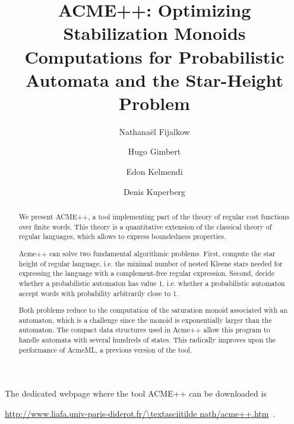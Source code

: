 \documentclass[11pt]{llncs}
\title{ACME++: Optimizing Stabilization Monoids Computations for Probabilistic Automata and the Star-Height Problem}
\author{Nathana\"el Fijalkow\inst{1,2} \and Hugo Gimbert\inst{3} \and Edon Kelmendi\inst{3} \and Denis Kuperberg\inst{4}}
\institute{LIAFA, Paris 7, France \and University of Warsaw, Poland \and LaBRI, Bordeaux, France \and Onera, Toulouse, France}
\begin{document}
\maketitle
\begin{abstract}
We present ACME++, 
a tool implementing part of the theory of regular cost functions
over finite words. 
This theory is a quantitative extension of the classical theory of regular languages,
which allows to express boundedness properties. 
%

Acme++ can solve two fundamental algorithmic problems.
First, compute the star height of regular language, 
i.e. the minimal number of nested Kleene stars needed for 
expressing the language with a complement-free regular expression.
Second, decide whether a probabilistic automaton has value 1,
i.e. whether a probabilistic automaton accept words with probability arbitrarily close to 1.

Both problems reduce to the computation of the saturation monoid associated with an automaton,
which is a challenge since the monoid is exponentially larger than the automaton.
The compact data structures used in Acme++ allow this program to handle automata with
several hundreds of states. This radically improves upon the performance of AcmeML,
a previous version of the tool.


\end{abstract}

The dedicated webpage where the tool ACME++ can be downloaded is
\begin{center}
\url{http://www.liafa.univ-paris-diderot.fr/\textasciitilde nath/acme++.htm}\ .
\end{center}











\end{document}
